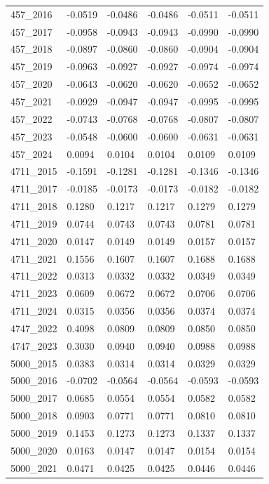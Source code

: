 \begin{table}[htbp]
\begin{tabular}{llllll}
457_2016 & -0.0519 & -0.0486 & -0.0486 & -0.0511 & -0.0511 \\
457_2017 & -0.0958 & -0.0943 & -0.0943 & -0.0990 & -0.0990 \\
457_2018 & -0.0897 & -0.0860 & -0.0860 & -0.0904 & -0.0904 \\
457_2019 & -0.0963 & -0.0927 & -0.0927 & -0.0974 & -0.0974 \\
457_2020 & -0.0643 & -0.0620 & -0.0620 & -0.0652 & -0.0652 \\
457_2021 & -0.0929 & -0.0947 & -0.0947 & -0.0995 & -0.0995 \\
457_2022 & -0.0743 & -0.0768 & -0.0768 & -0.0807 & -0.0807 \\
457_2023 & -0.0548 & -0.0600 & -0.0600 & -0.0631 & -0.0631 \\
457_2024 & 0.0094 & 0.0104 & 0.0104 & 0.0109 & 0.0109 \\
4711_2015 & -0.1591 & -0.1281 & -0.1281 & -0.1346 & -0.1346 \\
4711_2017 & -0.0185 & -0.0173 & -0.0173 & -0.0182 & -0.0182 \\
4711_2018 & 0.1280 & 0.1217 & 0.1217 & 0.1279 & 0.1279 \\
4711_2019 & 0.0744 & 0.0743 & 0.0743 & 0.0781 & 0.0781 \\
4711_2020 & 0.0147 & 0.0149 & 0.0149 & 0.0157 & 0.0157 \\
4711_2021 & 0.1556 & 0.1607 & 0.1607 & 0.1688 & 0.1688 \\
4711_2022 & 0.0313 & 0.0332 & 0.0332 & 0.0349 & 0.0349 \\
4711_2023 & 0.0609 & 0.0672 & 0.0672 & 0.0706 & 0.0706 \\
4711_2024 & 0.0315 & 0.0356 & 0.0356 & 0.0374 & 0.0374 \\
4747_2022 & 0.4098 & 0.0809 & 0.0809 & 0.0850 & 0.0850 \\
4747_2023 & 0.3030 & 0.0940 & 0.0940 & 0.0988 & 0.0988 \\
5000_2015 & 0.0383 & 0.0314 & 0.0314 & 0.0329 & 0.0329 \\
5000_2016 & -0.0702 & -0.0564 & -0.0564 & -0.0593 & -0.0593 \\
5000_2017 & 0.0685 & 0.0554 & 0.0554 & 0.0582 & 0.0582 \\
5000_2018 & 0.0903 & 0.0771 & 0.0771 & 0.0810 & 0.0810 \\
5000_2019 & 0.1453 & 0.1273 & 0.1273 & 0.1337 & 0.1337 \\
5000_2020 & 0.0163 & 0.0147 & 0.0147 & 0.0154 & 0.0154 \\
5000_2021 & 0.0471 & 0.0425 & 0.0425 & 0.0446 & 0.0446 \\

\end{tabular}
\end{table}
